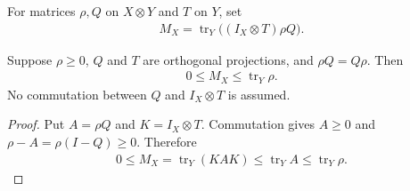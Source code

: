 \begin{definition}
    \label{def:restoring_marginal}
    \leanok
    For matrices $\rho,Q$ on $X\otimes Y$ and $T$ on $Y$, set
    \begin{align}
        M_X=\operatorname{tr}_Y\bigl((I_X\otimes T)\rho Q\bigr).
        \label{eq:restoring_marginal}
    \end{align}
\end{definition}

\begin{theorem}
    \label{thm:restoring_marginal_order}
    \leanok
    Suppose $\rho\ge0$, $Q$ and $T$ are orthogonal projections, and
    $\rho Q=Q\rho$. Then
    \begin{align}
        0\le M_X\le\operatorname{tr}_Y\rho.
        \label{eq:restoring_marginal_order}
    \end{align}
    No commutation between $Q$ and $I_X\otimes T$ is assumed.
\end{theorem}
\begin{proof}\leanok
    Put $A=\rho Q$ and $K=I_X\otimes T$. Commutation gives
    $A\ge0$ and $\rho-A=\rho(I-Q)\ge0$. Therefore
    \begin{align}
        0\le M_X=\operatorname{tr}_Y(KAK)
        \le\operatorname{tr}_Y A\le\operatorname{tr}_Y\rho.
    \end{align}
\end{proof}

